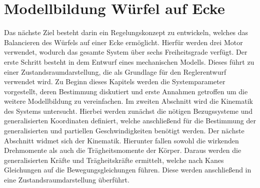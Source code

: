 \ifx\FORMAT\undefined


\fi

\chapter{Modellbildung Würfel auf Ecke}
Das nächste Ziel besteht darin ein Regelungskonzept zu entwickeln, welches das Balancieren des Würfels auf einer Ecke ermöglicht. Hierfür werden drei Motor verwendet, wodurch das gesamte System über sechs Freiheitsgrade verfügt. Der erste Schritt besteht in dem Entwurf eines mechanischen Modells. Dieses führt zu einer Zustandsraumdarstellung, die als Grundlage für den Reglerentwurf verwendet wird.
Zu Beginn dieses Kapitels werden die Systemparameter vorgestellt, deren Bestimmung diskutiert und erste Annahmen getroffen um die weitere Modellbildung zu vereinfachen. Im zweiten Abschnitt wird die Kinematik des Systems untersucht. Hierbei werden zunächst die nötigen Bezugssysteme und generalisierten Koordinaten definiert, welche anschließend für die Bestimmung der generalisierten und partiellen Geschwindigkeiten benötigt werden.
Der nächste Abschnitt widmet sich der Kinematik. Hierunter fallen sowohl die wirkenden Drehmomente als auch die Trägheitsmomente der Körper. Daraus werden die generalisierten Kräfte und Trägheitskräfte ermittelt, welche nach Kanes Gleichungen auf die Bewegungsgleichungen führen. Diese werden anschließend in eine Zustandsraumdarstellung überführt.
\newpage

\newpage

\newpage


\ifx\FORMAT\undefined

\fi